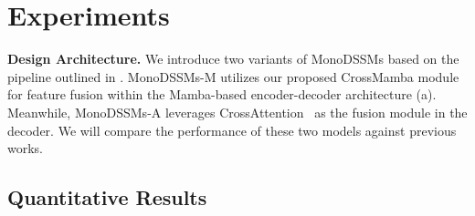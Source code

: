 \section{Experiments}
\textbf{Design Architecture.} We introduce two variants of MonoDSSMs based on the pipeline outlined in . MonoDSSMs-M utilizes our proposed CrossMamba module for feature fusion within the Mamba-based encoder-decoder architecture (a). Meanwhile, MonoDSSMs-A leverages CrossAttention~\cite{attention} as the fusion module in the decoder. We will compare the performance of these two models against previous works.

\subsection{Quantitative Results} \label{sec:quantitative_results}
